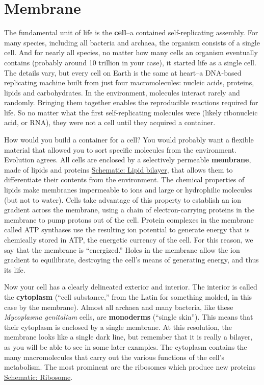 \documentclass[]{tufte-book}
\begin{document}
\section{Membrane}\label{membrane}

The fundamental unit of life is the \textbf{cell}--a contained
self-replicating assembly. For many species, including all bacteria and
archaea, the organism consists of a single cell. And for nearly all
species, no matter how many cells an organism eventually contains
(probably around 10 trillion in your case), it started life as a single
cell. The details vary, but every cell on Earth is the same at heart--a
DNA-based replicating machine built from just four macromolecules:
nucleic acids, proteins, lipids and carbohydrates. In the environment,
molecules interact rarely and randomly. Bringing them together enables
the reproducible reactions required for life. So no matter what the
first self-replicating molecules were (likely ribonucleic acid, or RNA),
they were not a cell until they acquired a container.

How would you build a container for a cell? You would probably want a
flexible material that allowed you to sort specific molecules from the
environment. Evolution agrees. All cells are enclosed by a selectively
permeable \textbf{membrane}, made of lipids and proteins
\protect\hyperlink{Lipid_bilayer}{Schematic: Lipid bilayer}, that allows
them to differentiate their contents from the environment. The chemical
properties of lipids make membranes impermeable to ions and large or
hydrophilic molecules (but not to water). Cells take advantage of this
property to establish an ion gradient across the membrane, using a chain
of electron-carrying proteins in the membrane to pump protons out of the
cell. Protein complexes in the membrane called ATP synthases use the
resulting ion potential to generate energy that is chemically stored in
ATP, the energetic currency of the cell. For this reason, we say that
the membrane is ``energized.'' Holes in the membrane allow the ion
gradient to equilibrate, destroying the cell's means of generating
energy, and thus its life.

Now your cell has a clearly delineated exterior and interior. The
interior is called the \textbf{cytoplasm} (``cell substance,'' from the
Latin for something molded, in this case by the membrane). Almost all
archaea and many bacteria, like these \emph{Mycoplasma genitalium}
cells, are \textbf{monoderms} (``single skin''). This means that their
cytoplasm is enclosed by a single membrane. At this resolution, the
membrane looks like a single dark line, but remember that it is really a
bilayer, as you will be able to see in some later examples. The
cytoplasm contains the many macromolecules that carry out the various
functions of the cell's metabolism. The most prominent are the ribosomes
which produce new proteins \protect\hyperlink{Ribosome}{Schematic:
Ribosome}.
\end{document}
